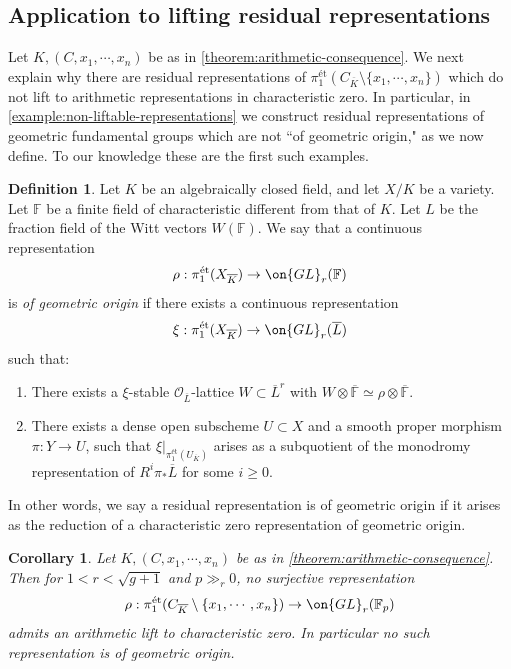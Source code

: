 \documentclass[12 pt]{amsart}
\theoremstyle{plain}
\newtheorem{corollary}[subsubsection]{Corollary}
\theoremstyle{definition}
\newtheorem{definition}[subsubsection]{Definition}
\theoremstyle{remark}
\numberwithin{equation}{section}
\begin{document}
\subsection{Application to lifting residual representations}
Let $K, (C, x_1, \cdots, x_n)$ be as in
\autoref{theorem:arithmetic-consequence}. We next explain why there are residual
representations of $\pi_1^{\text{\'et}}(C_{\overline{K}}\setminus\{x_1, \cdots,
x_n\})$ which do not lift to arithmetic representations in characteristic zero.
In particular, in \autoref{example:non-liftable-representations}
we construct residual representations of geometric
fundamental groups which are not ``of geometric origin," as we now define. To our knowledge these are the first such examples.
\begin{definition}
Let $K$ be an algebraically closed field, and let $X/K$ be a variety. Let $\mathbb{F}$ be a finite field of characteristic different from that of $K$. Let $L$ be the fraction field of the Witt vectors $W(\mathbb{F})$. We say that a continuous representation $$\rho: \pi_1^{\text{\'et}}(X_{\overline{K}})\to \on{GL}_r(\mathbb{F})$$ is \emph{of geometric origin} if there exists a continuous representation $$\xi: \pi_1^{\text{\'et}}(X_{\overline{K}})\to \on{GL}_r(\overline{L})$$ such that:
\begin{enumerate}
\item There exists a $\xi$-stable
	$\mathscr{O}_{\overline{L}}$-lattice $W\subset \overline{L}^r$ with
	$W\otimes \overline{\mathbb{F}}\simeq \rho \otimes
	\overline{\mathbb{F}}$.
\item There exists a dense open subscheme $U\subset X$ and a smooth proper morphism $\pi: Y\to U$, such that $\xi|_{\pi_1^{\text{\'et}}(U_{\overline{K}})}$ arises as a subquotient of the monodromy representation of $R^i\pi_*\overline{L}$ for some $i\geq 0.$
\end{enumerate}
\end{definition}
In other words, we say a residual representation is of geometric origin if it
arises as the reduction of a characteristic zero representation of geometric
origin.
\begin{corollary}\label{corollary:lifting-and-geometric-origin}
	Let $K, (C, x_1, \cdots, x_n)$ be as in \autoref{theorem:arithmetic-consequence}. Then for $1<r<\sqrt{g+1}$ and  $p\gg_r 0$, no surjective representation 
	$$\rho: \pi_1^{\text{\'et}}(C_{\overline{K}}\setminus\{x_1, \cdots, x_n\})\to \on{GL}_r(\mathbb{F}_p)$$ admits an arithmetic lift to characteristic zero. In particular no such representation is of geometric origin.
\end{corollary}
\end{document}
